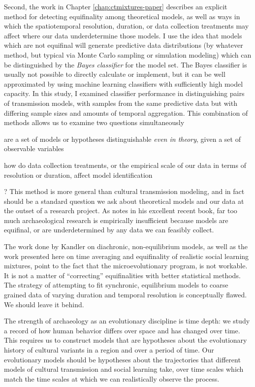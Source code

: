 Second, the work in Chapter \ref{chap:ctmixtures-paper} describes an explicit method for detecting equifinality among theoretical models, as well as ways in which the spatiotemporal resolution, duration, or data collection treatments may affect where our data underdetermine those models.  I use the idea that models which are not equifinal will generate predictive data distributions (by whatever method, but typical via Monte Carlo sampling or simulation modeling) which can be distinguished by the \emph{Bayes classifier} for the model set.  The Bayes classifier is usually not possible to directly calculate or implement, but it can be well approximated by using machine learning classifiers with sufficiently high model capacity.  In this study, I examined classifier performance in distinguishing pairs of transmission models, with samples from the same predictive data but with differing sample sizes and amounts of temporal aggregation.  This combination of methods allows us to examine two questions simultaneously \begin{dissparalist}
\item are a set of models or hypotheses distinguishable \emph{even in theory}, given a set of observable variables
\item how do data collection treatments, or the empirical scale of our data in terms of resolution or duration, affect model identification
\end{dissparalist}?  This method is more general than cultural transmission modeling, and in fact should be a standard question we ask about theoretical models and our data at the outset of a research project.  As \citet{perreault2019quality} notes in his excellent recent book, far too much archaeological research is empirically insufficient because models are equifinal, or are underdetermined by any data we can feasibly collect.  

The work done by Kandler on diachronic, non-equilibrium models, as well as the work presented here on time averaging and equifinality of realistic social learning mixtures, point to the fact that the microevolutionary program, is not workable.  It is not a matter of ``correcting'' equifinalities with better statistical methods.  The strategy of attempting to fit synchronic, equilibrium models to coarse grained data of varying duration and temporal resolution is conceptually flawed.  We should leave it behind.

The strength of archaeology as an evolutionary discipline is time depth:  we study a record of how human behavior differs over space and has changed over time.  This requires us to construct models that are hypotheses about the evolutionary history of cultural variants in a region and over a period of time.  Our evolutionary models should be hypotheses about the trajectories that different models of cultural transmission and social learning take, over time scales which match the time scales at which we can realistically observe the process.  

